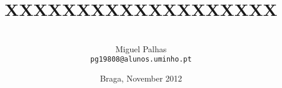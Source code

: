 \documentclass[a4paper,abstract=on]{scrartcl}
\title{XXXXXXXXXXXXXXXXXXX}
\author{\\Miguel Palhas\\\texttt{\smaller pg19808@alunos.uminho.pt}}
\date{Braga, November 2012}
\begin{document}
  \maketitle

  
  
  
  
  

  
  \nocite*{}
  
  \newpage

  
\end{document}
